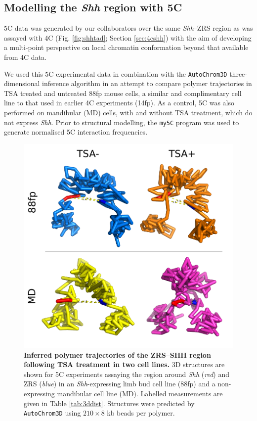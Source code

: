 \documentclass[a4paper,11pt,oneside]{book}
\begin{document}
\subsection{Modelling the \emph{Shh} region with 5C}\label{sec:shh5c}

5C data was generated by our collaborators over the same \emph{Shh}--ZRS region as was assayed with 4C (Fig. \ref{fig:shhtad}; Section \ref{sec:4cshh}) with the aim of developing a multi-point perspective on local chromatin conformation beyond that available from 4C data.

We used this 5C experimental data in combination with the \texttt{AutoChrom3D} three-dimensional inference algorithm\cite{Peng2013} in an attempt to compare polymer trajectories in TSA treated and untreated 88fp mouse cells, a similar and complimentary cell line to that used in earlier 4C experiments (14fp). As a control, 5C was also performed on mandibular (MD) cells, with and without TSA treatment, which do not express \emph{Shh}. Prior to structural modelling, the \texttt{my5C} program was used to generate normalised 5C interaction frequencies.\cite{Lajoie2009a}

\begin{figure}
\begin{center} 
\includegraphics[width=5.45in]{figs/5c3d.pdf}
\captionsetup{width=\textwidth} 
\caption[ Inferred polymer trajectories of the ZRS--SHH region following TSA treatment in two cell lines. ]{ {\bf Inferred polymer trajectories of the ZRS--SHH region following TSA treatment in two cell lines. }
3D structures are shown for 5C experiments assaying the region around \emph{Shh} (\emph{red}) and ZRS (\emph{blue}) in an \emph{Shh}-expressing limb bud cell line (88fp) and a non-expressing mandibular cell line (MD). Labelled measurements are given in Table \ref{tab:3ddist}. Structures were predicted by \texttt{AutoChrom3D}\cite{Peng2013} using $210 \times 8$ kb beads per polymer.
}\label{fig:5c3d}
\end{center} 
\end{figure} 
\end{document}
